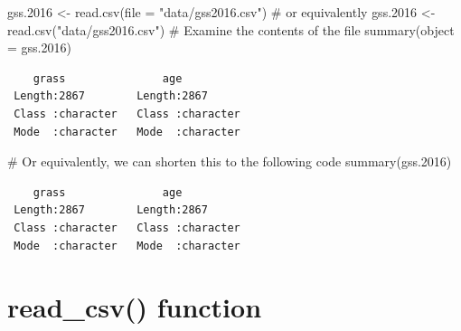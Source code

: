 \documentclass[
  letterpaper,
  DIV=11,
  numbers=noendperiod]{scrreprt}
\newenvironment{Shaded}{\begin{snugshade}}{\end{snugshade}}
\newcommand{\AttributeTok}[1]{\textcolor[rgb]{0.40,0.45,0.13}{#1}}
\newcommand{\CommentTok}[1]{\textcolor[rgb]{0.37,0.37,0.37}{#1}}
\newcommand{\FloatTok}[1]{\textcolor[rgb]{0.68,0.00,0.00}{#1}}
\newcommand{\FunctionTok}[1]{\textcolor[rgb]{0.28,0.35,0.67}{#1}}
\newcommand{\NormalTok}[1]{\textcolor[rgb]{0.00,0.23,0.31}{#1}}
\newcommand{\OtherTok}[1]{\textcolor[rgb]{0.00,0.23,0.31}{#1}}
\newcommand{\StringTok}[1]{\textcolor[rgb]{0.13,0.47,0.30}{#1}}
\begin{document}
\begin{Shaded}
\begin{Highlighting}[]
\NormalTok{gss}\FloatTok{.2016} \OtherTok{\textless{}{-}} \FunctionTok{read.csv}\NormalTok{(}\AttributeTok{file =} \StringTok{"data/gss2016.csv"}\NormalTok{)}
\CommentTok{\# or equivalently}
\NormalTok{gss}\FloatTok{.2016} \OtherTok{\textless{}{-}} \FunctionTok{read.csv}\NormalTok{(}\StringTok{"data/gss2016.csv"}\NormalTok{)}
\CommentTok{\# Examine the contents of the file}
\FunctionTok{summary}\NormalTok{(}\AttributeTok{object =}\NormalTok{ gss}\FloatTok{.2016}\NormalTok{)}
\end{Highlighting}
\end{Shaded}

\begin{verbatim}
    grass               age           
 Length:2867        Length:2867       
 Class :character   Class :character  
 Mode  :character   Mode  :character  
\end{verbatim}

\begin{Shaded}
\begin{Highlighting}[]
\CommentTok{\# Or equivalently, we can shorten this to the following code}
\FunctionTok{summary}\NormalTok{(gss}\FloatTok{.2016}\NormalTok{)}
\end{Highlighting}
\end{Shaded}

\begin{verbatim}
    grass               age           
 Length:2867        Length:2867       
 Class :character   Class :character  
 Mode  :character   Mode  :character  
\end{verbatim}

\section{read\_csv() function}\label{read_csv-function}
\end{document}
